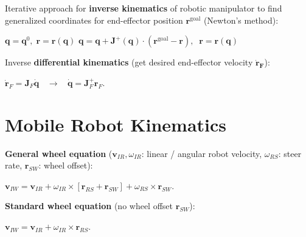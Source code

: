 \documentclass[landscape]{article}
\newcommand{\vmspace}{\vspace{-7pt}}
\newcommand{\vamspace}{\vspace{-3pt}}
\newcommand{\vpspace}{\vspace{5pt}}
\newcommand{\vtspace}{\vspace{-10pt}}
\begin{document}
\begin{multicols}{3}
\vpspace

\begin{minipage}{\columnwidth}
  Iterative approach for \textbf{inverse kinematics} of robotic manipulator to
  find generalized coordinates for end-effector position $\mathbf r^\text{goal}$
  (Newton's method):

  \vamspace

  \begin{algorithm}[H]
    $\mathbf q = \mathbf q^0,\;\mathbf r = \mathbf r(\mathbf q)$\;
    {
    $\mathbf q = \mathbf q + \mathbf J^+(\mathbf q) \cdot (\mathbf r^\text{goal}
    - \mathbf r),\;\;
    \mathbf r = \mathbf r ( \mathbf q )$\;
    }
  \end{algorithm}
\end{minipage}

\vpspace

\begin{minipage}{\columnwidth}
  Inverse \textbf{differential kinematics} (get desired end-effector velocity
  $\mathbf{\dot{r}_F}$):
  \vmspace
  \begin{center}
    $\mathbf{\dot r}_F = \mathbf J_F \mathbf{\dot q}$
    $\;\;\rightarrow\;\;$
    $\mathbf{\dot q} = \mathbf J_F^+ \mathbf r_F.$
  \end{center}
\end{minipage}


\vtspace

\section{Mobile Robot Kinematics}

\vmspace

\begin{minipage}{\columnwidth}
  \textbf{General wheel equation} ($\mathbf v_{IR}, \omega_{IR}$: linear /
  angular robot velocity, $\omega_{RS}$: steer rate, $\mathbf r_{SW}$: wheel
  offset):
  \vmspace
  \begin{center}
    $\mathbf v_{IW} = \mathbf v_{IR} + \omega_{IR} \times [\mathbf r_{RS} +
    \mathbf r_{SW}] +
    \omega_{RS} \times \mathbf r_{SW}.$
  \end{center}
\end{minipage}

\vpspace

\begin{minipage}{\columnwidth}
  \textbf{Standard wheel equation} (no wheel offset $\mathbf r_{SW}$):
  \vmspace
  \begin{center}
    $\mathbf v_{IW} = \mathbf v_{IR} + \omega_{IR} \times \mathbf r_{RS}.$
  \end{center}
\end{minipage}


\end{multicols}
\end{document}
